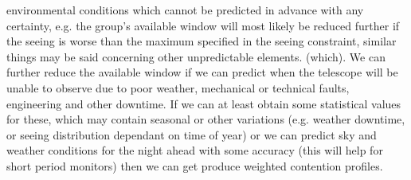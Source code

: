 environmental conditions which cannot be predicted in advance with any certainty, e.g. the group's available window will most likely be reduced further if the seeing is worse than the maximum specified in the seeing constraint, similar things may be said concerning other unpredictable elements. (which). We can further reduce the available window if we can predict when the telescope will be unable to observe due to poor weather, mechanical or technical faults, engineering and other downtime. If we can at least obtain some statistical values for these, which may contain seasonal or other variations (e.g. weather downtime, or seeing distribution dependant on time of year) or we can predict sky and weather conditions for the night ahead with some accuracy (this will help for short period monitors) then we can get produce weighted contention profiles.





